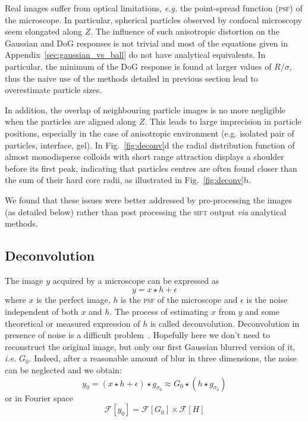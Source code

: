 \documentclass[8.5pt,twoside,twocolumn]{article}
\begin{document}
Real images suffer from optical limitations, \emph{e.g.} the point-spread function (\textsc{psf}) of the microscope. In particular, spherical particles observed by confocal microscopy seem elongated along $Z$. The influence of such anisotropic distortion on the Gaussian and DoG responses is not trivial and most of the equations given in Appendix~\ref{sec:gaussian_vs_ball} do not have analytical equivalents. In particular, the minimum of the DoG response is found at larger values of $R/\sigma$, thus the naive use of the methods detailed in previous section lead to overestimate particle sizes.

In addition, the overlap of neighbouring particle images is no more negligible when the particles are aligned along $Z$. This leads to large imprecision in particle positions, especially in the case of anisotropic environment (e.g. isolated pair of particles, interface, gel). In Fig.~\ref{fig:deconv}d the radial distribution function of almost monodisperse colloids with short range attraction displays a shoulder before its first peak, indicating that particles centres are often found closer than the sum of their hard core radii, as illustrated in Fig.~\ref{fig:deconv}b.

We found that these issues were better addressed by pre-processing the images (as detailed below) rather than post processing the \textsc{sift} output \emph{via} analytical methods.

\subsection{Deconvolution}
The image $y$ acquired by a microscope can be expressed as 
\begin{equation}
y = x \star h + \epsilon
\end{equation}
where $x$ is the perfect image, $h$ is the \textsc{psf} of the microscope and $\epsilon$ is the noise independent of both $x$ and $h$. The process of estimating $x$ from $y$ and some theoretical or measured expression of $h$ is called deconvolution. Deconvolution in presence of noise is a difficult problem~\cite{Riad1986}. Hopefully here we don't need to reconstruct the original image, but only our first Gaussian blurred version of it, \emph{i.e.} $G_0$. Indeed, after a reasonable amount of blur in three dimensions, the noise can be neglected and we obtain:
\begin{equation}
y_0 = (x \star h + \epsilon) \star g_{\sigma_0} \approx G_0 \star (h \star g_{\sigma_0})
\end{equation}
or in Fourier space
\begin{equation}
\mathcal{F}[y_0] = \mathcal{F}[G_0] \times \mathcal{F}[H]
\label{eq:Fourier_conv}
\end{equation}
\end{document}
